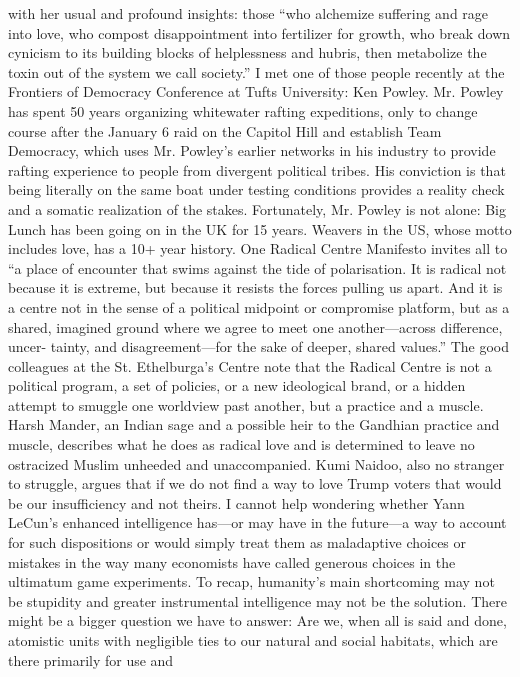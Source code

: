 with her usual and profound insights: those “who alchemize suffering and rage into love, who compost
disappointment into fertilizer for growth, who break down cynicism to its building blocks of helplessness
and hubris, then metabolize the toxin out of the system we call society.” I met one of those people recently
at the Frontiers of Democracy Conference at Tufts University: Ken Powley. Mr. Powley has spent 50 years
organizing whitewater rafting expeditions, only to change course after the January 6 raid on the Capitol Hill
and establish Team Democracy, which uses Mr. Powley’s earlier networks in his industry to provide rafting
experience to people from divergent political tribes. His conviction is that being literally on the same boat
under testing conditions provides a reality check and a somatic realization of the stakes.
Fortunately, Mr. Powley is not alone: Big Lunch has been going on in the UK for 15 years. Weavers in the
US, whose motto includes love, has a 10+ year history. One Radical Centre Manifesto invites all to “a place
of encounter that swims against the tide of polarisation. It is radical not because it is extreme, but because it
resists the forces pulling us apart. And it is a centre not in the sense of a political midpoint or compromise
platform, but as a shared, imagined ground where we agree to meet one another—across difference, uncer-
tainty, and disagreement—for the sake of deeper, shared values.” The good colleagues at the St. Ethelburga’s
Centre note that the Radical Centre is not a political program, a set of policies, or a new ideological brand,
or a hidden attempt to smuggle one worldview past another, but a practice and a muscle. Harsh Mander,
an Indian sage and a possible heir to the Gandhian practice and muscle, describes what he does as radical
love and is determined to leave no ostracized Muslim unheeded and unaccompanied. Kumi Naidoo, also no
stranger to struggle, argues that if we do not find a way to love Trump voters that would be our insuﬀiciency
and not theirs. I cannot help wondering whether Yann LeCun’s enhanced intelligence has—or may have in
the future—a way to account for such dispositions or would simply treat them as maladaptive choices or
mistakes in the way many economists have called generous choices in the ultimatum game experiments.
To recap, humanity’s main shortcoming may not be stupidity and greater instrumental intelligence may not
be the solution. There might be a bigger question we have to answer: Are we, when all is said and done,
atomistic units with negligible ties to our natural and social habitats, which are there primarily for use and
